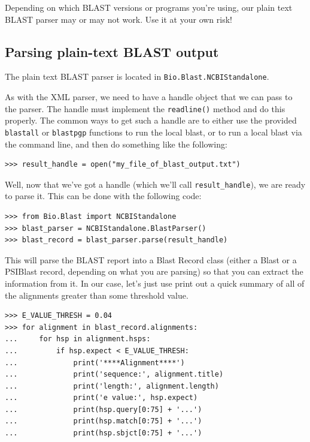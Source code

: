\documentclass{report}
\begin{document}
Depending on which BLAST versions or programs you're using, our plain text BLAST parser may or may not work. Use it at your own risk!

\subsection{Parsing plain-text BLAST output}

The plain text BLAST parser is located in \verb|Bio.Blast.NCBIStandalone|.

As with the XML parser, we need to have a handle object that we can pass to the parser. The handle must implement the \verb|readline()| method and do this properly. The common ways to get such a handle are to either use the provided \verb|blastall| or \verb|blastpgp| functions to run the local blast, or to run a local blast via the command line, and then do something like the following:

\begin{verbatim}
>>> result_handle = open("my_file_of_blast_output.txt")
\end{verbatim}

Well, now that we've got a handle (which we'll call \verb|result_handle|),
we are ready to parse it. This can be done with the following code:

\begin{verbatim}
>>> from Bio.Blast import NCBIStandalone
>>> blast_parser = NCBIStandalone.BlastParser()
>>> blast_record = blast_parser.parse(result_handle)
\end{verbatim}

This will parse the BLAST report into a Blast Record class (either a Blast or a PSIBlast record, depending on what you are parsing) so that you can extract the information from it. In our case, let's just use print out a quick summary of all of the alignments greater than some threshold value.

\begin{verbatim}
>>> E_VALUE_THRESH = 0.04
>>> for alignment in blast_record.alignments:
...     for hsp in alignment.hsps:
...         if hsp.expect < E_VALUE_THRESH:
...             print('****Alignment****')
...             print('sequence:', alignment.title)
...             print('length:', alignment.length)
...             print('e value:', hsp.expect)
...             print(hsp.query[0:75] + '...')
...             print(hsp.match[0:75] + '...')
...             print(hsp.sbjct[0:75] + '...')
\end{verbatim}
\end{document}
